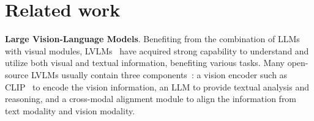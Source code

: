 \section{Related work}
\noindent\textbf{Large Vision-Language Models}. 
Benefiting from the combination of LLMs~\citep{radford2018improving,radford2019language,BrownMRSKDNSSAA20,peng2023instruction} with visual modules, LVLMs~\citep{LiuLWL23a,openai2023gpt,claude3,reid2024gemini,liu2023improved,NEURIPS2023_9a6a435e,zhu2023minigpt,chen2024sharegpt4v,ye2023mplug,awadalla2023openflamingo,wang2023cogvlm,bai2023qwen,li2023blip,ye2023mplug,ye2023mplug2,yang2024law,sun2023generative} have acquired strong capability to understand and utilize both visual and textual information, benefiting various tasks. Many open-source LVLMs usually contain three components~\citep{LiDZWZW23}: a vision encoder such as CLIP~\cite{radford2021learning} to encode the vision information, an LLM to provide textual analysis and reasoning, and a cross-modal alignment module to align the information from text modality and vision modality.




